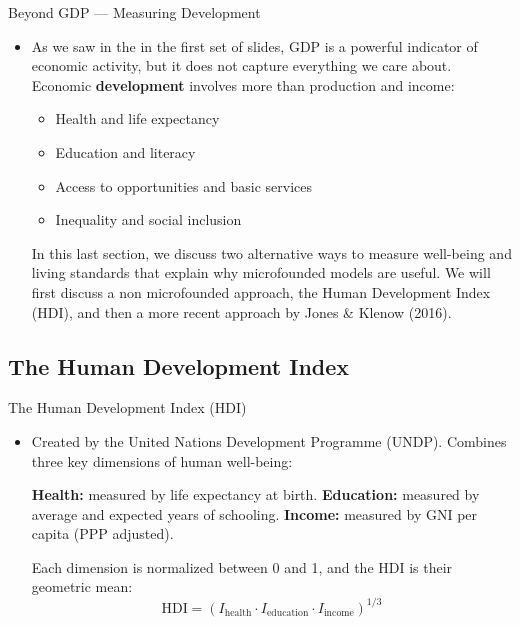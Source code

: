 \documentclass[10pt,aspectratio=169]{beamer}
\begin{document}
\begin{frame}{Beyond GDP — Measuring Development}

\begin{itemize}
    \item As we saw in the in the first set of slides, GDP is a powerful indicator of economic activity, but it does not capture everything we care about.
    \itemvso Economic \textbf{development} involves more than production and income:
    \begin{itemize}
        \item Health and life expectancy
        \item Education and literacy
        \item Access to opportunities and basic services
        \item Inequality and social inclusion
    \end{itemize}
    \itemvso In this last section, we discuss two alternative ways to measure well-being and living standards that explain why microfounded models are useful.
    \itemvso We will first discuss a non microfounded approach, the Human Development Index (HDI), and then a more recent approach by Jones \& Klenow (2016).
\end{itemize}

\end{frame}

\subsection{The Human Development Index}
\begin{frame}{The Human Development Index (HDI)}

\begin{itemize}
    \item Created by the United Nations Development Programme (UNDP).
    \itemvso Combines three key dimensions of human well-being:
    \begin{enumerate}
        \itemvso \textbf{Health:} measured by life expectancy at birth.
        \itemvso \textbf{Education:} measured by average and expected years of schooling.
        \itemvso \textbf{Income:} measured by GNI per capita (PPP adjusted).
    \end{enumerate}
    \itemvso Each dimension is normalized between 0 and 1, and the HDI is their geometric mean:
    \[
    \text{HDI} = (I_{\text{health}} \cdot I_{\text{education}} \cdot I_{\text{income}})^{1/3}
    \]
\end{itemize}


\end{frame}
\end{document}
